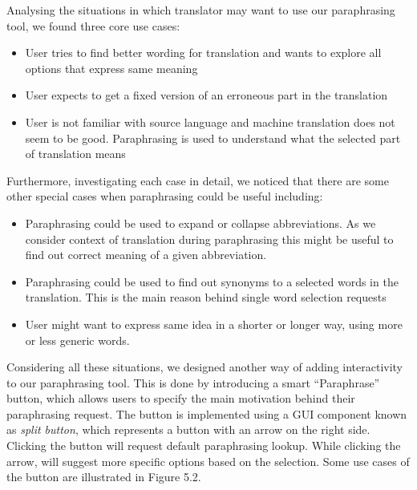 Analysing the situations in which translator may want to use our paraphrasing tool, we found three core use cases:

\begin{itemize}
    \item User tries to find better wording for translation and wants to explore all options that express same meaning
    \item User expects to get a fixed version of an erroneous part in the translation
    \item User is not familiar with source language and machine translation does not seem to be good. Paraphrasing is used to understand what the selected part of translation means  
\end{itemize}

Furthermore, investigating each case in detail, we noticed that there are some other special cases when paraphrasing could be useful including:

\begin{itemize}
    \item Paraphrasing could be used to expand or collapse abbreviations. As we consider context of translation during paraphrasing this might be useful to find out correct meaning of a given abbreviation.

    \item Paraphrasing could be used to find out synonyms to a selected words in the translation. This is the main reason behind single word selection requests

    \item User might want to express same idea in a shorter or longer way, using more or less generic words. 
\end{itemize}

Considering all these situations, we designed another way of adding interactivity to our paraphrasing tool. This is done by introducing a smart ``Paraphrase'' button, which allows users to specify the main motivation behind their paraphrasing request. The button is implemented using a GUI component known as \emph{split button}, which represents a button with an arrow on the right side. Clicking the button will request default paraphrasing lookup. While clicking the arrow, will suggest more specific options based on the selection. Some use cases of the button are illustrated in Figure 5.2.   

